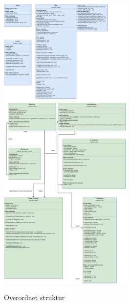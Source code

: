 \documentclass[]{article}
\begin{document}
\pagebreak
\begin{figure}[h!]
	\centering
	\includegraphics[width=250px]{Structural_diagram.jpg}
	\label{fig:structure}
	\caption{Overordnet struktur}
\end{figure}
\end{document}
